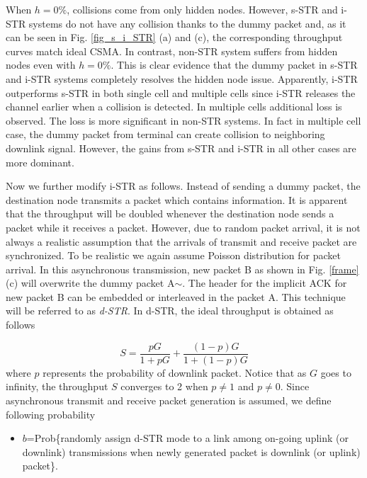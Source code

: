 \documentclass[twocolumn]{IEEEtran}
\begin{document}
When $h=0\%$, collisions come from only hidden nodes. However, s-STR
and i-STR systems do not have any collision thanks to the dummy
packet and, as it can be seen in Fig. \ref{fig_s_i_STR} (a) and (c),
the corresponding throughput curves match ideal CSMA. In contrast,
non-STR system suffers from hidden nodes even with $h=0\%$. This is
clear evidence that the dummy packet in s-STR and i-STR systems
completely resolves the hidden node issue. Apparently, i-STR
outperforms s-STR in both single cell and multiple cells since i-STR
releases the channel earlier when a collision is detected. In
multiple cells additional loss is observed. The loss is more
significant in non-STR systems. In fact in multiple cell case, the
dummy packet from terminal can create collision to neighboring
downlink signal. However, the gains from s-STR and i-STR in all
other cases are more dominant.

Now we further modify i-STR as follows. Instead of sending a dummy
packet, the destination node transmits a packet which contains
information. It is apparent that the throughput will be doubled
whenever the destination node sends a packet while it receives a
packet. However, due to random packet arrival, it is not always a
realistic assumption that the arrivals of transmit and receive
packet are synchronized. To be realistic we again assume Poisson
distribution for packet arrival. In this asynchronous transmission,
new packet B as shown in Fig. \ref{frame} (c) will overwrite the
dummy packet A$\sim$. The header for the implicit ACK for new packet
B can be embedded or interleaved in the packet A. This technique
will be referred to as \textit{d-STR}. In d-STR, the ideal
throughput is obtained as follows

\begin{equation}
S=\frac{pG}{1+pG}+\frac{(1-p)G}{1+(1-p)G}
\end{equation}
where $p$ represents the probability of downlink packet. Notice that
as $G$ goes to infinity, the throughput $S$ converges to 2 when
$p\neq1$ and $p\neq0$. Since asynchronous transmit and receive
packet generation is assumed, we define following probability

\begin{itemize}
\item $b$=Prob\{randomly assign d-STR mode to a link among on-going uplink (or
downlink) transmissions when newly generated packet is downlink (or
uplink) packet\}.
\end{itemize}
\end{document}
